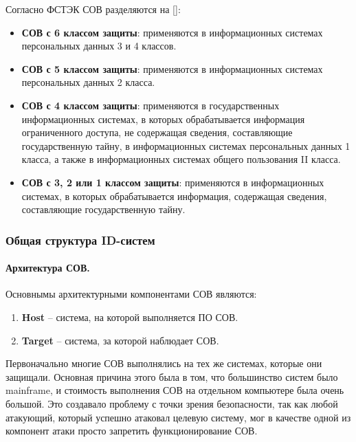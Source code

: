Согласно ФСТЭК СОВ разделяются на [\cite{IDSFSTEK}]:
\begin{itemize}
	\item \textbf{СОВ с 6 классом защиты}: применяются в информационных системах
	персональных данных 3 и 4 классов.

	\item \textbf{СОВ с 5 классом защиты}: применяются в информационных системах
	персональных данных 2 класса.

	\item \textbf{СОВ с 4 классом защиты}: применяются в государственных информационных
	системах, в которых обрабатывается информация ограниченного доступа, не содержащая
	сведения, составляющие государственную тайну, в информационных системах персональных
	данных 1 класса, а также в информационных системах общего пользования II класса.

	\item \textbf{СОВ с 3, 2 или 1 классом защиты}: применяются в информационных системах,
	в которых обрабатывается информация, содержащая сведения, составляющие государственную
	тайну.
\end{itemize}



\subsubsection{Общая структура ID-систем}


\paragraph*{Архитектура СОВ.} Основнымы архитектурными компонентами СОВ являются:

\begin{enumerate}
	\item \textbf{Host} -- система, на которой выполняется ПО СОВ.

	\item \textbf{Target} -- система, за которой наблюдает СОВ.
\end{enumerate}

Первоначально многие СОВ выполнялись на тех же системах, которые они защищали.
Основная причина этого была в том, что большинство систем было mainframe, и стоимость
выполнения СОВ на отдельном компьютере была очень большой. Это создавало проблему с
точки зрения безопасности, так как любой атакующий, который успешно атаковал целевую
систему, мог в качестве одной из компонент атаки просто запретить функционирование СОВ.

